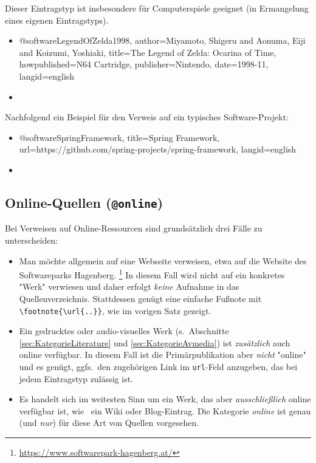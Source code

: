 Dieser Eintragstyp ist insbesondere für Computerspiele geeignet (in
Ermangelung eines eigenen Eintragstyps).
%
\begin{itemize}
\item[]
\begin{GenericCode}[numbers=none]
@software{LegendOfZelda1998,
  author={Miyamoto, Shigeru and Aonuma, Eiji and Koizumi, Yoshiaki},
  title={The Legend of Zelda: Ocarina of Time},
  howpublished={N64 Cartridge},
  publisher={Nintendo},
  date={1998-11},
  langid={english}
}
\end{GenericCode}
\item[\cite{LegendOfZelda1998}] 
\end{itemize}

\noindent
Nachfolgend ein Beispiel für den Verweis auf ein typisches Software-Projekt:
%
\begin{itemize}
\item[]
\begin{GenericCode}[numbers=none]
@software{SpringFramework,
  title={Spring Framework},
  url={https://github.com/spring-projects/spring-framework},
  langid={english}
}
\end{GenericCode}
\item[\cite{SpringFramework}] 
\end{itemize}



\subsection{Online-Quellen (\texttt{\bfseries @online})}
\label{sec:KategorieOnline}

Bei Verweisen auf Online-Ressourcen sind grundsätzlich drei Fälle zu
unterscheiden:
%
\begin{itemize}
    \item[A.] Man möchte allgemein auf eine Webseite verweisen, etwa auf die
    Website des Softwareparks Hagenberg.%
    \footnote{\url{https://www.softwarepark-hagenberg.at/}}
    In diesem Fall wird nicht auf ein konkretes "Werk" verwiesen und daher
    erfolgt \emph{keine} Aufnahme in das Quellenverzeichnis. Stattdessen genügt
    eine einfache Fußnote mit \verb!\footnote{\url{..}}!, wie im vorigen Satz
    gezeigt.
%
    \item[B.] Ein gedrucktes oder audio-visuelles Werk (s.\ Abschnitte
    \ref{sec:KategorieLiterature} und \ref{sec:KategorieAvmedia}) ist
    \emph{zusätzlich} auch online verfügbar. In diesem Fall ist die
    Primär\-publikation aber \emph{nicht} "online" und es genügt, ggfs.\ den
    zugehörigen Link im \texttt{url}-Feld anzugeben, das bei jedem Eintragstyp
    zulässig ist.
%
    \item[C.] Es handelt sich im weitesten Sinn um ein Werk, das aber
    \emph{ausschließlich} online verfügbar ist, wie \zB\ ein Wiki oder
    Blog-Eintrag. Die Kategorie \emph{online} ist genau (und \emph{nur}) für
    diese Art von Quellen vorgesehen.
\end{itemize}


